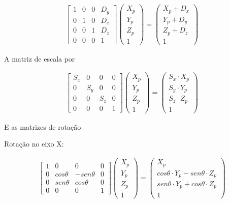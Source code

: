 {\begin{align}
\left[\begin{array}{cccc}
1 & 0 & 0 & D_y\\
0 & 1 & 0 & D_x\\
0 & 0 & 1 & D_z\\
0 & 0 & 0 & 1
\end{array}\right]
\left(\begin{array}{c}
X_p\\
Y_p\\
Z_p\\
1
\end{array}\right) =
\left(\begin{array}{c}
X_p + D_x\\
Y_p + D_y\\
Z_p + D_z\\
1
\end{array}\right)
\label{eq:rend_translationMat}
\end{align}

A matriz de escala por

\begin{align}
\left[\begin{array}{cccc}
S_x & 0 & 0 & 0\\
0 & S_y & 0 & 0\\
0 & 0 & S_z & 0\\
0 & 0 & 0 & 1
\end{array}\right]
\left(\begin{array}{c}
X_p\\
Y_p\\
Z_p\\
1
\end{array}\right) =
\left(\begin{array}{c}
S_x \cdot X_p\\
S_y \cdot Y_p\\
S_z \cdot Z_p\\
1
\end{array}\right)
\label{eq:rend_scaleMat}
\end{align}

E as matrizes de rotação

Rotação no eixo X:

\begin{align}
\left[\begin{array}{cccc}
1 & 0 & 0 & 0\\
0 & cos\theta & -sen\theta & 0\\
0 & sen\theta & cos\theta & 0\\
0 & 0 & 0 & 1
\end{array}\right]
\left(\begin{array}{c}
X_p\\
Y_p\\
Z_p\\
1
\end{array}\right) =
\left(\begin{array}{c}
X_p\\
cos\theta \cdot Y_p - sen\theta \cdot Z_p\\
sen\theta \cdot Y_p + cos\theta \cdot Z_p\\
1
\end{array}\right)
\label{eq:rend_rotationMatX}
\end{align}

}
